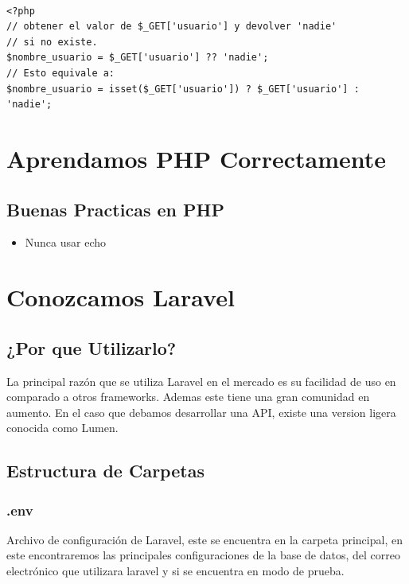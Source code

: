 \documentclass[spanish]{theme/pclreport}
\begin{document}
\begin{lstlisting}[caption={isset vs ??},captionpos=b]

<?php
// obtener el valor de $_GET['usuario'] y devolver 'nadie'
// si no existe.
$nombre_usuario = $_GET['usuario'] ?? 'nadie';
// Esto equivale a:
$nombre_usuario = isset($_GET['usuario']) ? $_GET['usuario'] : 'nadie';
\end{lstlisting}


\chapter{Aprendamos PHP Correctamente}

\section{Buenas Practicas en PHP}

\begin{itemize}  
\item Nunca usar echo
\
\end{itemize}





\chapter{Conozcamos Laravel}

\section{¿Por que Utilizarlo?}

La principal razón que se utiliza Laravel en el mercado es su facilidad de uso en comparado a otros frameworks. Ademas este tiene una gran comunidad en aumento. En el caso que debamos desarrollar una API, existe una version ligera conocida como Lumen.

\section{Estructura de Carpetas}

\subsection{.env}
Archivo de configuración de Laravel, este se encuentra en la carpeta principal, en este encontraremos las principales configuraciones de la base de datos, del correo electrónico que utilizara laravel y si se encuentra en modo de prueba.
\end{document}
